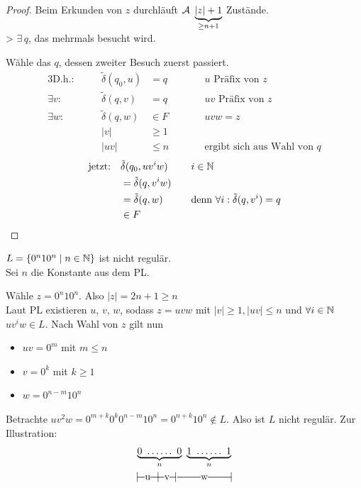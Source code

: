 {\begin{proof}
	Beim Erkunden von $z$ durchläuft $\mathcal{A}\ \underbrace{|z|+1}_{\geq n+1}$ Zustände.\\
	\-> $\exists\, q$, das mehrmals besucht wird.
	
	Wähle das $q$, dessen zweiter Besuch zuerst passiert.
	\begin{alignat*}{3}
		\text{D.h.}:&\quad& \tilde\delta(q_0,u)&=q &\qquad& u\text{ Präfix von }z\\
		\exists v:&& \tilde\delta(q,v)&=q && uv\text{ Präfix von }z\\
		\exists w:&& \tilde\delta(q,w)&\in F && uvw=z\\
		&& |v| &\geq 1\\
		&& |uv| &\leq n && \text{ergibt sich aus Wahl von }q
	\end{alignat*}
	\begin{alignat*}{2}
		\text{jetzt:}\quad &\tilde\delta(q_0,uv^iw) &\quad& i\in\mathbb{N}\\
		&= \tilde\delta(q,v^iw)\\
		&= \tilde\delta(q,w) && \text{denn }\forall i: \tilde\delta(q,v^i)=q\\
		&\in F \tag*{\qedhere}
	\end{alignat*}
\end{proof}
%
\begin{Bsp*}
        $L=\{0^n10^n \mid n\in\mathbb{N}\}$ ist nicht regulär.\\
        Sei $n$ die Konstante aus dem \ac{PL}.
        
        Wähle $z=0^n10^n$. Also $|z|=2n+1\geq n$\\
        Laut PL existieren $u$, $v$, $w$, sodass $z=uvw$ mit $|v|\geq 1, |uv|\leq n$ und $\forall i \in \mathbb{N}$ $uv^iw \in L$. Nach Wahl von $z$ gilt nun
  \begin{itemize}
  \item $uv = 0^m$ mit $m\leq n$
  \item $v = 0^k$ mit $k\geq 1$
  \item $w = 0^{n-m}10^n$ 
  \end{itemize}
  Betrachte $uv^2w = 0^{m+k}0^k0^{n-m}10^n = 0^{n+k}10^n \notin L$.
  Also ist $L$ nicht regulär.
  Zur Illustration:
        \begin{gather*}
                \underbrace{0\ \dots\dots\ 0}_{n} \ \underbrace{1\ \dots\dots\ 1}_{n}\\
                |\!\ruleplaceholder[u]{\widthof{0\ \dots }} \!|\! \ruleplaceholder[v]{\widthof{\dots 0}}\!|%
                \ruleplaceholder[w]{\widthof{\ \ \ $1\ \dots\dots\ 1$}}\!|
        \end{gather*}
  

\end{Bsp*}}
